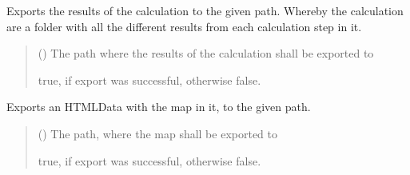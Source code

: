 \documentclass[letterpaper,10pt,english]{sphinxmanual}
\begin{document}
\begin{fulllineitems}
\begin{fulllineitems}
\label{\detokenize{apidoc/src.osm_configurator.model.project:src.osm_configurator.model.project.export.Export.export_calculation}}
\pysigstartsignatures
{}
\pysigstopsignatures
\sphinxAtStartPar
Exports the results of the calculation to the given path.
Whereby the calculation are a folder with all the different results from each
calculation step in it.
\begin{quote}\begin{description}
\sphinxAtStartPar
{} () \textendash{} The path where the results of the calculation shall be exported to

\sphinxAtStartPar
true, if export was successful, otherwise false.

\sphinxAtStartPar
{}

\end{description}\end{quote}

\end{fulllineitems}


\begin{fulllineitems}
\label{\detokenize{apidoc/src.osm_configurator.model.project:src.osm_configurator.model.project.export.Export.export_map}}
\pysigstartsignatures
{}
\pysigstopsignatures
\sphinxAtStartPar
Exports an HTML\sphinxhyphen{}Data with the map in it, to the given path.
\begin{quote}\begin{description}
\sphinxAtStartPar
{} () \textendash{} The path, where the map shall be exported to

\sphinxAtStartPar
true, if export was successful, otherwise false.

\sphinxAtStartPar
{}

\end{description}\end{quote}

\end{fulllineitems}


\end{fulllineitems}
\end{document}
